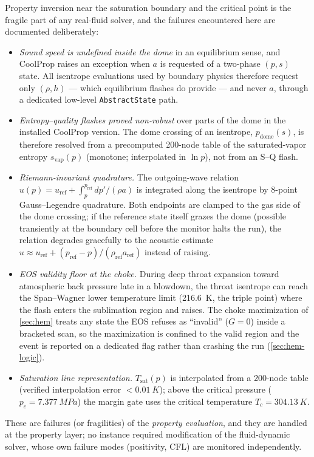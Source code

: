 \documentclass[11pt]{article}
\begin{document}
Property inversion near the saturation boundary and the critical point
is the fragile part of any real-fluid solver, and the failures
encountered here are documented deliberately:
\begin{itemize}
\item \emph{Sound speed is undefined inside the dome} in an equilibrium
sense, and CoolProp raises an exception when $a$ is requested of a
two-phase $(p,s)$ state. All isentrope evaluations used by boundary
physics therefore request only $(\rho, h)$ --- which equilibrium
flashes do provide --- and never $a$, through a dedicated low-level
\texttt{AbstractState} path.
\item \emph{Entropy--quality flashes proved non-robust} over parts of
the dome in the installed CoolProp version. The dome crossing of an
isentrope, $p_{\mathrm{dome}}(s)$, is therefore resolved from a
precomputed 200-node table of the saturated-vapor entropy
$s_{\mathrm{vap}}(p)$ (monotone; interpolated in $\ln p$), not from an
S--Q flash.
\item \emph{Riemann-invariant quadrature.} The outgoing-wave relation
$u(p) = u_{\mathrm{ref}} + \int_p^{p_{\mathrm{ref}}} dp'/(\rho a)$ is
integrated along the isentrope by 8-point Gauss--Legendre quadrature.
Both endpoints are clamped to the gas side of the dome crossing; if the
reference state itself grazes the dome (possible transiently at the
boundary cell before the monitor halts the run), the relation degrades
gracefully to the acoustic estimate
$u \approx u_{\mathrm{ref}} + (p_{\mathrm{ref}}-p)/(\rho_{\mathrm{ref}}
a_{\mathrm{ref}})$ instead of raising.
\item \emph{EOS validity floor at the choke.} During deep throat
expansion toward atmospheric back pressure late in a blowdown, the
throat isentrope can reach the Span--Wagner lower temperature limit
(\SI{216.6}{K}, the triple point) where the flash enters the
sublimation region and raises. The choke maximization of
\cref{sec:hem} treats any state the EOS refuses as ``invalid''
($G=0$) inside a bracketed scan, so the maximization is confined to
the valid region and the event is reported on a dedicated flag rather
than crashing the run (\cref{sec:hem-logic}).
\item \emph{Saturation line representation.} $T_{\mathrm{sat}}(p)$ is
interpolated from a 200-node table (verified interpolation error
$<\SI{0.01}{K}$); above the critical pressure
($p_c = \SI{7.377}{MPa}$) the margin gate uses the critical
temperature $T_c = \SI{304.13}{K}$.
\end{itemize}
These are failures (or fragilities) of the \emph{property evaluation},
and they are handled at the property layer; no instance required
modification of the fluid-dynamic solver, whose own failure modes
(positivity, CFL) are monitored independently.
\end{document}
